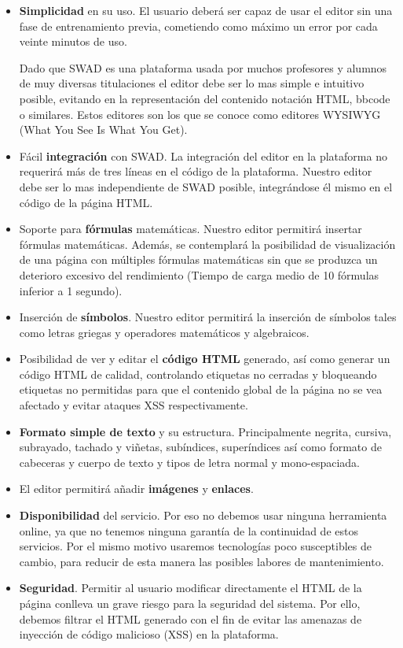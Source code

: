 \begin{itemize}
\item \textbf{Simplicidad} en su uso. El usuario deberá ser capaz de usar el editor sin una fase de entrenamiento previa, cometiendo como máximo un error por cada veinte minutos de uso. 

Dado que SWAD es una plataforma usada por muchos profesores y alumnos de muy diversas titulaciones el editor debe ser lo mas simple e intuitivo posible, evitando en la representación del contenido notación HTML, bbcode o similares. Estos editores son los que se conoce como editores WYSIWYG (What You See Is What You Get).

\item Fácil \textbf{integración} con SWAD. La integración del editor en la plataforma no requerirá más de tres líneas en el código de la plataforma. Nuestro editor debe ser lo mas independiente de SWAD posible, integrándose él mismo en el código de la página HTML. 

\item Soporte para \textbf{fórmulas} matemáticas. Nuestro editor permitirá insertar fórmulas matemáticas. Además, se contemplará la posibilidad de visualización de una página con múltiples fórmulas matemáticas sin que se produzca un deterioro excesivo del rendimiento (Tiempo de carga medio de 10 fórmulas inferior a 1 segundo).

\item Inserción de \textbf{símbolos}. Nuestro editor permitirá la inserción de símbolos tales como letras griegas y operadores matemáticos y algebraicos.

\item Posibilidad de ver y editar el \textbf{código HTML} generado, así como generar un código HTML de calidad, controlando etiquetas no cerradas y bloqueando etiquetas no permitidas para que el contenido global de la página no se vea afectado y evitar ataques XSS respectivamente.

\item \textbf{Formato simple de texto} y su estructura. Principalmente negrita, cursiva, subrayado, tachado y viñetas, subíndices, superíndices así como formato de cabeceras y cuerpo de texto y tipos de letra normal y mono-espaciada. 

\item El editor permitirá añadir \textbf{imágenes} y \textbf{enlaces}.

\item \textbf{Disponibilidad} del servicio. Por eso no debemos usar ninguna herramienta online, ya que no tenemos ninguna garantía de la continuidad de estos servicios. Por el mismo motivo usaremos tecnologías poco susceptibles de cambio, para reducir de esta manera las posibles labores de mantenimiento.

\item \textbf{Seguridad}. Permitir al usuario modificar directamente el HTML de la página conlleva un grave riesgo para la seguridad del sistema. Por ello, debemos filtrar el HTML generado con el fin de evitar las amenazas de inyección de código malicioso (XSS) en la plataforma.

\end{itemize}

